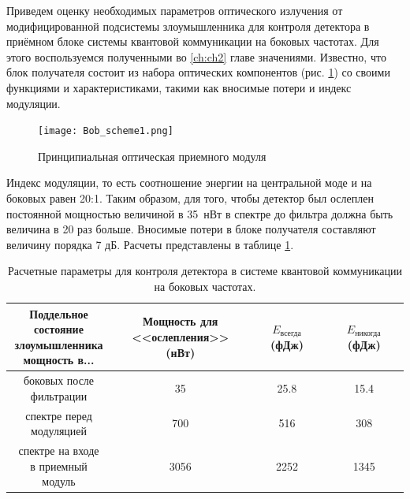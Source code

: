  Приведем оценку необходимых параметров оптического излучения от модифицированной подсистемы злоумышленника для контроля детектора в приёмном блоке системы квантовой коммуникации на боковых частотах. Для этого воспользуемся полученными во \ref{ch:ch2} главе значениями. Известно, что блок получателя состоит из набора оптических компонентов (рис. \ref{fig:Bob}) со своими функциями и характеристиками, такими как вносимые потери и индекс модуляции.

 
 \begin{figure}[ht]
  \centering
  \texttt{[image: Bob\_scheme1.png]}
  \caption{Принципиальная оптическая приемного модуля}
  \label{fig:Bob}
\end{figure}



Индекс модуляции, то есть соотношение энергии на центральной моде и на боковых равен 20:1. Таким образом, для того, чтобы детектор был ослеплен постоянной мощностью величиной в 35~нВт в спектре до фильтра должна быть величина в 20 раз больше.  Вносимые потери в блоке получателя составляют величину порядка 7 дБ. Расчеты представлены в таблице \ref{tab:blinding}.

 
 
\begin{table}
	\caption{\label{tab:blinding}Расчетные параметры для контроля детектора в системе квантовой коммуникации на боковых частотах.}
	\begin{tabular}[t]{c c c c}
	\hline\hline
	\makecell{Поддельное\\состояние\\злоумышленника\\мощность в...} & \makecell{Мощность для\\<<ослепления>> (нВт)} & $E_\text{всегда}$ (фДж) & $E_\text{никогда}$ (фДж) \\
	\hline
	\makecell{боковых после\\ фильтрации} & 35 & 25.8 & 15.4 \\
	\makecell{спектре перед\\ модуляцией} & 700 & 516 & 308 \\
	\makecell{спектре на входе\\ в приемный модуль} & 3056 & 2252 & 1345 \\
	\hline\hline
	\end{tabular}
\end{table}


\pagebreak


